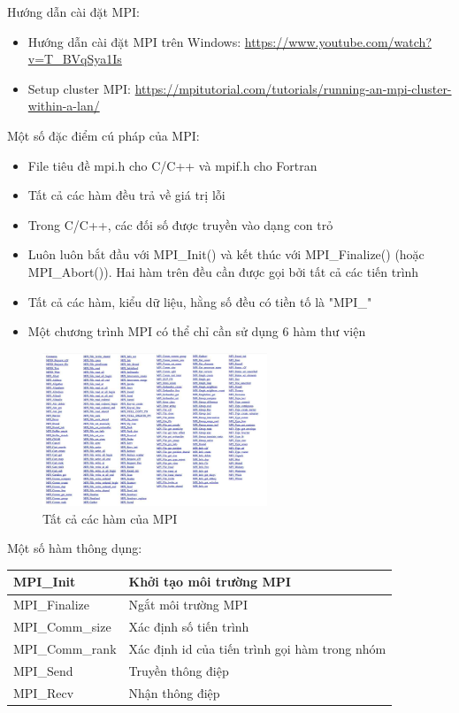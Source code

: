 \documentclass[14pt, a4paper]{article}
\numberwithin{equation}{section}
\numberwithin{figure}{section}
\numberwithin{dl}{section}
\numberwithin{md}{section}
\numberwithin{bd}{section}
\numberwithin{dn}{section}
\numberwithin{hq}{section}
\begin{document}
Hướng dẫn cài đặt MPI:

\begin{itemize}
    \item Hướng dẫn cài đặt MPI trên Windows: \url{https://www.youtube.com/watch?v=T_BVqSya1Is}
    \item Setup cluster MPI: \url{https://mpitutorial.com/tutorials/running-an-mpi-cluster-within-a-lan/}
\end{itemize}

Một số đặc điểm cú pháp của MPI:

\begin{itemize}
    \item File tiêu đề mpi.h cho C/C++ và mpif.h cho Fortran
    \item Tất cả các hàm đều trả về giá trị lỗi
    \item Trong C/C++, các đối số được truyền vào dạng con trỏ
    \item Luôn luôn bắt đầu với MPI\_Init() và kết thúc với MPI\_Finalize() (hoặc MPI\_Abort()).
    Hai hàm trên đều cần được gọi bởi tất cả các tiến trình
    \item Tất cả các hàm, kiểu dữ liệu, hằng số đều có tiền tố là "MPI\_"
    \item Một chương trình MPI có thể chỉ cần sử dụng 6 hàm thư viện
\end{itemize}

\begin{figure}[H]
    \centering
    \includegraphics[width=0.6\textwidth]{figures/MPI/MPI_Full_Routines.png}
    \caption{Tất cả các hàm của MPI}
\end{figure}

Một số hàm thông dụng:

\begin{table}[H]
    \centering
    \begin{tabular}{|l|l|}
        \hline
        MPI\_Init & Khởi tạo môi trường MPI \\
        \hline
        MPI\_Finalize & Ngắt môi trường MPI \\
        \hline
        MPI\_Comm\_size & Xác định số tiến trình \\
        \hline
        MPI\_Comm\_rank & Xác định id của tiến trình gọi hàm trong nhóm \\
        \hline
        MPI\_Send & Truyền thông điệp \\
        \hline
        MPI\_Recv & Nhận thông điệp \\
        \hline
\end{tabular}
\end{table}
\end{document}
